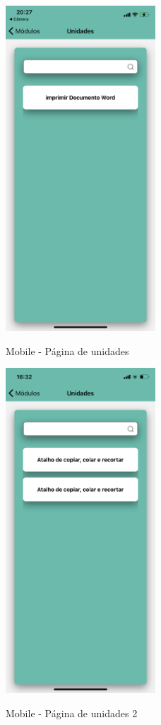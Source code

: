 \begin{figure}[H]
    \centering
    \caption{Mobile - Página de unidades}
    \includegraphics[width=0.5\textwidth]{figuras/Mobile - pagina de unidade.PNG}
    \label{fig:wireframe_mobile_tela_de_unidades}
    {}
\end{figure}

\begin{figure}[H]
    \centering
    \caption{Mobile - Página de unidades 2}
    \includegraphics[width=0.5\textwidth]{figuras/Mobile - pagina de unidade2.png}
    \label{fig:wireframe_mobile_tela_de_unidades2}
    {}
\end{figure}

